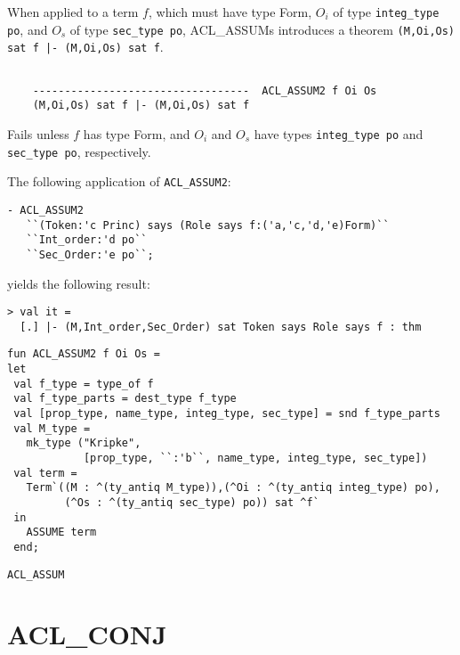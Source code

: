 \DESCRIBE When applied to a term $f$, which must have type Form, $O_i$
of type \texttt{integ_type po}, and $O_s$ of type \texttt{sec_type
  po}, ACL_ASSUMs introduces a theorem \texttt{(M,Oi,Os) sat f |-
  (M,Oi,Os) sat f}.
\begin{verbatim}

    ----------------------------------  ACL_ASSUM2 f Oi Os
    (M,Oi,Os) sat f |- (M,Oi,Os) sat f
\end{verbatim}

\FAILURE Fails unless $f$ has type Form, and $O_i$ and $O_s$ have
types \texttt{integ\_type po} and \texttt{sec\_type po}, respectively.

\EXAMPLE
The following application of \texttt{ACL\_ASSUM2}:
\begin{holboxed}
\begin{verbatim}
- ACL_ASSUM2 
   ``(Token:'c Princ) says (Role says f:('a,'c,'d,'e)Form)`` 
   ``Int_order:'d po`` 
   ``Sec_Order:'e po``;
\end{verbatim}
\end{holboxed}
yields the following result:
\begin{holboxed}
\begin{verbatim}
> val it =  
  [.] |- (M,Int_order,Sec_Order) sat Token says Role says f : thm
\end{verbatim}
\end{holboxed}

\IMPLEMENTATION
\begin{holboxed}
\begin{verbatim}
fun ACL_ASSUM2 f Oi Os = 
let
 val f_type = type_of f
 val f_type_parts = dest_type f_type
 val [prop_type, name_type, integ_type, sec_type] = snd f_type_parts
 val M_type = 
   mk_type ("Kripke",
            [prop_type, ``:'b``, name_type, integ_type, sec_type])
 val term = 
   Term`((M : ^(ty_antiq M_type)),(^Oi : ^(ty_antiq integ_type) po),
         (^Os : ^(ty_antiq sec_type) po)) sat ^f`
 in
   ASSUME term
 end;
\end{verbatim}
\end{holboxed}

\SEEALSO
\texttt{ACL\_ASSUM}
\ENDDOC

\section{ACL\_CONJ}


